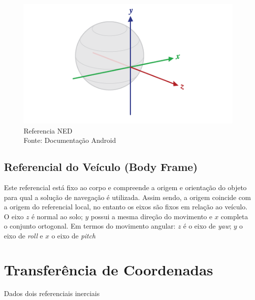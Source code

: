 \begin{figure}
    \centering
    \includegraphics{Figuras/referencialterra.png}
    \caption{Referencia NED \\ Fonte: Documentação Android}
    \label{fig:referencialTerra}
\end{figure}{}

\subsection{Referencial do Veículo (Body Frame)}

Este referencial está fixo ao corpo e compreende a origem e orientação do objeto para qual a solução de navegação é utilizada. Assim sendo, a origem coincide com a origem do referencial local, no entanto os eixos são fixos em relação ao veículo. O eixo $z$ é normal ao solo; $y$ possui a mesma direção do movimento e $x$ completa o conjunto ortogonal.
Em termos do movimento angular: $z$ é o eixo de \textit{yaw}; $y$ o eixo de \textit{roll} e $x$ o eixo de \textit{pitch}

\section{Transferência de Coordenadas}

Dados dois referenciais inerciais


